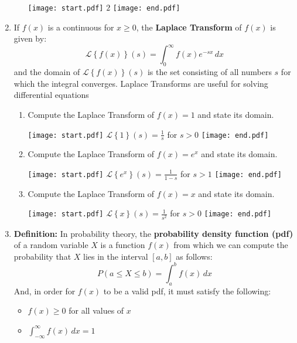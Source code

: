 \documentclass[12pt]{article}
\begin{document}
\begin{enumerate}
\begin{enumerate}
\texttt{[image: start.pdf]}
{{$2$}}
\texttt{[image: end.pdf]}


\end{enumerate}

\item If $f(x)$ is a continuous for $x \geq 0$, the {\bf Laplace Transform} of $f(x)$ is given by: $$\mathcal{L}\left\{f(x)\right\}(s)=\int_0^{\infty} f(x)e^{-sx}\,dx$$
and the domain of $\mathcal{L}\left\{f(x)\right\}(s)$ is the set consisting of all numbers $s$ for which the integral converges.  Laplace Transforms are useful for solving differential equations

\begin{enumerate}

\item Compute the Laplace Transform of $f(x)=1$ and state its domain.

\texttt{[image: start.pdf]}
{{$\mathcal{L}\left\{1\right\}(s)=\frac{1}{s}$ for $s >0$}}
\texttt{[image: end.pdf]}


\item Compute the Laplace Transform of $f(x)=e^x$ and state its domain.

\texttt{[image: start.pdf]}
{{$\mathcal{L}\left\{e^x\right\}(s)=\frac{1}{1-s}$ for $s >1$}}
\texttt{[image: end.pdf]}


\item Compute the Laplace Transform of $f(x)=x$ and state its domain.

\texttt{[image: start.pdf]}
{{$\mathcal{L}\left\{x\right\}(s)=\frac{1}{s^2}$ for $s >0$}}
\texttt{[image: end.pdf]}


\end{enumerate}

\item {\bf Definition:} In probability theory, the {\bf probability density function (pdf)} of a random variable $X$ is a function $f(x)$ from which we can compute the probability that $X$ lies in the interval $[a,b]$ as follows: $$P(a\leq X \leq b)=\int_a^b f(x) \,dx$$  And, in order for $f(x)$ to be a valid pdf, it must satisfy the following:

\begin{itemize}

\item $f(x) \geq 0$ for all values of $x$

\item $\int_{-\infty}^{\infty} f(x) \,dx=1$

\end{itemize}


\end{enumerate}
\end{document}

